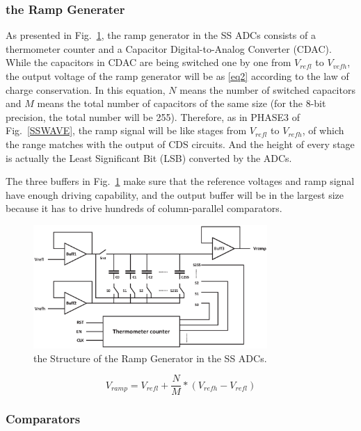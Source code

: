\subsubsection{the Ramp Generater}

As presented in Fig.~\ref{RAMP}, the ramp generator in the SS ADCs consists of a thermometer counter and a Capacitor Digital-to-Analog Converter (CDAC). 
While the capacitors in CDAC are being switched one by one from $V_{refl}$ to $V_{vefh}$, the output voltage of the ramp generator will be as \eqref{eq2} according to the law of charge conservation. 
In this equation, $N$ means the number of switched capacitors and $M$ means the total number of capacitors of the same size (for the 8-bit precision, the total number will be 255). 
Therefore, as in PHASE3 of Fig.~\ref{SSWAVE}, the ramp signal will be like stages from $V_{refl}$ to $V_{refh}$, of which the range matches with the output of CDS circuits. 
And the height of every stage is actually the Least Significant Bit (LSB) converted by the ADCs.

The three buffers in Fig.~\ref{RAMP} make sure that the reference voltages and ramp signal have enough driving capability, 
and the output buffer will be in the largest size because it has to drive hundreds of column-parallel comparators.

\begin{figure}[htbp]
	\centerline{\includegraphics[width=3.5in]{./Figures/RAMP.eps}}
	\caption{the Structure of the Ramp Generator in the SS ADCs.}
	\label{RAMP}
\end{figure} 

\begin{equation}
	V_{ramp}=V_{refl}+\frac{N}{M}\ast\left(V_{refh}-V_{refl}\right)
	\label{eq2}
\end{equation}

\subsubsection{Comparators}

